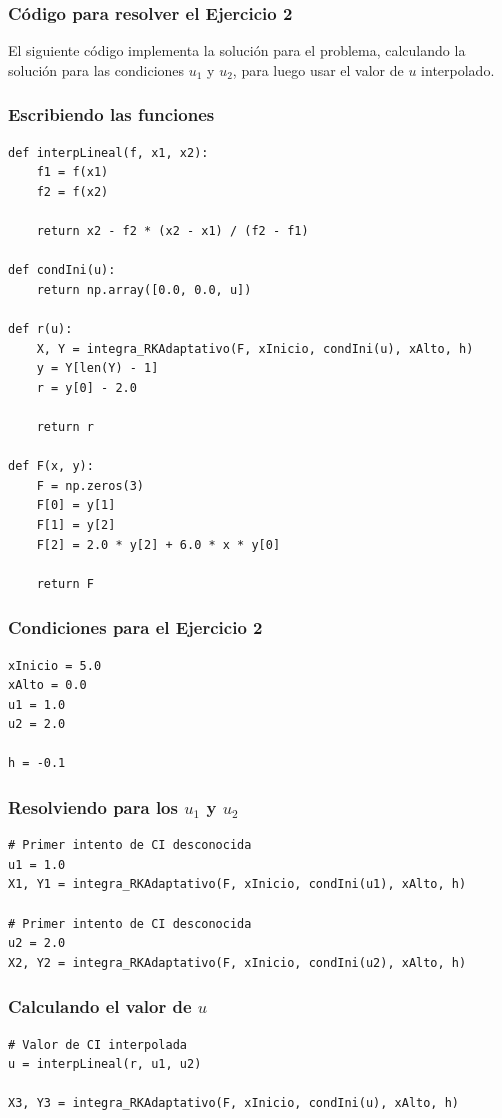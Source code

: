 \documentclass[12pt]{beamer}
\begin{document}
\begin{frame}
\frametitle{Código para resolver el Ejercicio 2}
El siguiente código implementa la solución para el problema, calculando la solución para las condiciones $u_{1}$ y $u_{2}$, para luego usar el valor de $u$ interpolado.
\end{frame}
\begin{frame}
\frametitle{Escribiendo las funciones}
\begin{lstlisting}[caption=Las funciones necesarias para el problema]
def interpLineal(f, x1, x2):
    f1 = f(x1)
    f2 = f(x2)

    return x2 - f2 * (x2 - x1) / (f2 - f1)

def condIni(u):
    return np.array([0.0, 0.0, u])

def r(u):
    X, Y = integra_RKAdaptativo(F, xInicio, condIni(u), xAlto, h)
    y = Y[len(Y) - 1]
    r = y[0] - 2.0
    
    return r

def F(x, y):
    F = np.zeros(3)
    F[0] = y[1]
    F[1] = y[2]
    F[2] = 2.0 * y[2] + 6.0 * x * y[0]
    
    return F
\end{lstlisting}
\end{frame}
\begin{frame}[fragile]
\frametitle{Condiciones para el Ejercicio 2}
\begin{lstlisting}[caption=Las condiciones para el ejercicio]
xInicio = 5.0
xAlto = 0.0
u1 = 1.0
u2 = 2.0

h = -0.1
\end{lstlisting}
\end{frame}
\begin{frame}[fragile]
\frametitle{Resolviendo para los $u_{1}$ y $u_{2}$}
\begin{lstlisting}[caption=Evaluando con los valores de prueba]
# Primer intento de CI desconocida
u1 = 1.0
X1, Y1 = integra_RKAdaptativo(F, xInicio, condIni(u1), xAlto, h)

# Primer intento de CI desconocida
u2 = 2.0
X2, Y2 = integra_RKAdaptativo(F, xInicio, condIni(u2), xAlto, h)
\end{lstlisting}
\end{frame}
\begin{frame}[fragile]
\frametitle{Calculando el valor de $u$}
\begin{lstlisting}[caption=Calculando el valor interpolado de u]
# Valor de CI interpolada
u = interpLineal(r, u1, u2)

X3, Y3 = integra_RKAdaptativo(F, xInicio, condIni(u), xAlto, h)    
\end{lstlisting}
\end{frame}
\end{document}
